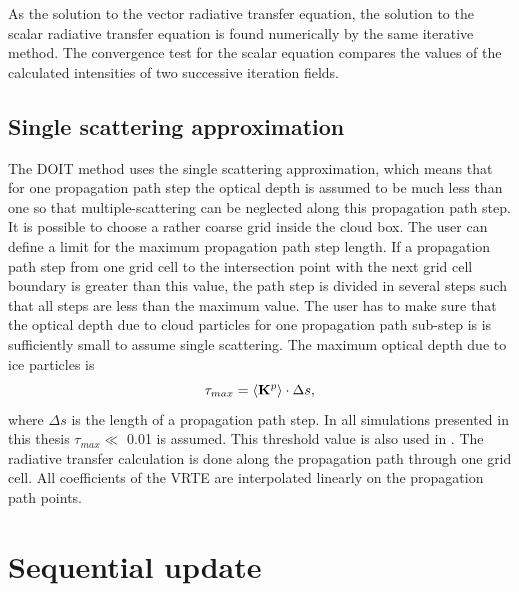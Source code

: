 As the solution to the vector radiative transfer equation, the solution
to the scalar radiative transfer equation is found numerically by the
same iterative method.  The convergence test for the scalar equation
compares the values of the calculated intensities of two successive
iteration fields.

\subsection{Single scattering approximation}
\label{sec:scattering:ss_approx}

The DOIT method uses the single scattering approximation, which means
that for one propagation path step the optical depth is assumed to be
much less than one so that multiple-scattering can be neglected along
this propagation path step. It is possible to choose a rather
coarse grid inside the cloud box. The user can define a limit
for the maximum propagation path step length. If a propagation path step from one
grid cell to the intersection point with the next grid cell boundary
is greater than this value, the path step is divided in several steps such
that all steps are less than the maximum value. The user has to make
sure that the optical depth due to cloud particles for one propagation
path sub-step is is sufficiently small to assume
single scattering. The maximum optical depth due to ice particles is 
\begin{equation}
  \tau_{max} = \left\langle {\bf K}^p \right\rangle \cdot \Delta s,
\end{equation}
where $\Delta s$ is the length of a propagation  path step. In all
simulations presented in this thesis $\tau_{max} \ll$ 0.01 is
assumed. This threshold value is also used in \citet{czekala99:_microw}.
The radiative transfer calculation
is done along the propagation path through one grid cell.  All
coefficients of the VRTE are interpolated linearly on the propagation
path points.

\section{Sequential update}\label{chap:numerical_methods}
\label{sec:scattering:sequential_update}


